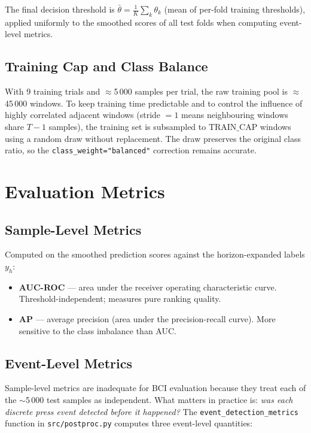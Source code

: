\documentclass[12pt,a4paper]{article}
\begin{document}
The final decision threshold is $\bar{\theta} = \frac{1}{K}\sum_k \theta_k$
(mean of per-fold training thresholds), applied uniformly to the smoothed
scores of all test folds when computing event-level metrics.

\subsection{Training Cap and Class Balance}

With 9 training trials and $\approx$5\,000 samples per trial, the raw
training pool is $\approx$45\,000 windows. To keep training time predictable
and to control the influence of highly correlated adjacent windows (stride
$= 1$ means neighbouring windows share $T-1$ samples), the training set is
subsampled to $\text{TRAIN\_CAP}$ windows using a random draw without
replacement. The draw preserves the original class ratio, so the
\texttt{class\_weight="balanced"} correction remains accurate.

\section{Evaluation Metrics}

\subsection{Sample-Level Metrics}

Computed on the smoothed prediction scores against the horizon-expanded
labels $y_h$:

\begin{itemize}[leftmargin=1.5em]
  \item \textbf{AUC-ROC} — area under the receiver operating characteristic
        curve. Threshold-independent; measures pure ranking quality.
  \item \textbf{AP} — average precision (area under the precision-recall
        curve). More sensitive to the class imbalance than AUC.
\end{itemize}

\subsection{Event-Level Metrics}

Sample-level metrics are inadequate for BCI evaluation because they treat
each of the $\sim$5\,000 test samples as independent. What matters in
practice is: \emph{was each discrete press event detected before it
happened?} The \texttt{event\_detection\_metrics} function in
\texttt{src/postproc.py} computes three event-level quantities:
\end{document}
